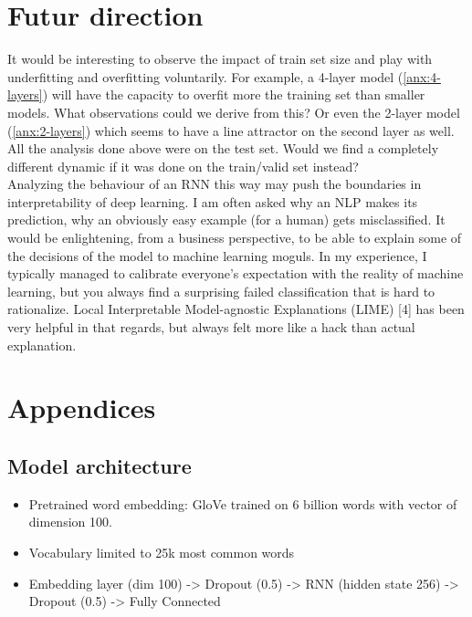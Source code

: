 \documentclass{article}
\begin{document}
\section{Futur direction}
\label{sec:futur-direction}
It would be interesting to observe the impact of train set size and play with underfitting and overfitting voluntarily. For example, a 4-layer model (\ref{anx:4-layers}) will have the capacity to overfit more the training set than smaller models. What observations could we derive from this? Or even the 2-layer model (\ref{anx:2-layers}) which seems to have a line attractor on the second layer as well. \\
All the analysis done above were on the test set. Would we find a completely different dynamic if it was done on the train/valid set instead?\\
Analyzing the behaviour of an RNN this way may push the boundaries in interpretability of deep learning. I am often asked why an NLP makes its prediction, why an obviously easy example (for a human) gets misclassified. It would be enlightening, from a business perspective, to be able to explain some of the decisions of the model to machine learning moguls. In my experience, I typically managed to calibrate everyone's expectation with the reality of machine learning, but you always find a surprising failed classification that is hard to rationalize. Local Interpretable Model-agnostic Explanations (LIME) [4]  has been very helpful in that regards, but always felt more like a hack than actual explanation.

\appendix

\section*{Appendices}
\renewcommand{\thesubsection}{\Alph{subsection}}


\subsection{Model architecture}
\begin{itemize}
  \item Pretrained word embedding: GloVe trained on 6 billion words with vector of dimension 100.
  \item Vocabulary limited to 25k most common words
  \item Embedding layer (dim 100) -> Dropout (0.5) -> RNN (hidden state 256) -> Dropout (0.5) -> Fully Connected 
\end{itemize}
\end{document}
